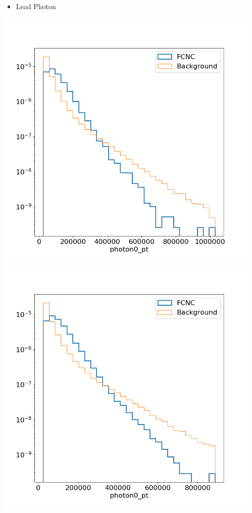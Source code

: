 \documentclass[10pt]{beamer}
\begin{document}
{\begin{columns}
\begin{column}{0.33\textwidth}
\end{column}
\begin{column}{0.33\textwidth}
\begin{itemize}
\item Lead Photon
\end{itemize}
\includegraphics[width=.85\textwidth]{Images/ejetsvarplots/photon0_pt.png} \\
\includegraphics[width=.85\textwidth]{Images/mujetsvarplots/photon0_pt.png}
\end{column}

\end{columns}}
\end{document}
